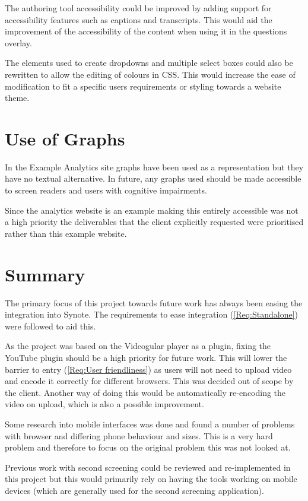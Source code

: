 The authoring tool accessibility could be improved by adding support for accessibility features such as captions and transcripts. This would aid the improvement of the accessibility of the content when using it in the questions overlay.

The elements used to create dropdowns and multiple select boxes could also be rewritten to allow the editing of colours in \gls{CSS}. This would increase the ease of modification to fit a specific users requirements or styling towards a website theme.

\section{Use of Graphs}

In the Example Analytics site graphs have been used as a representation but they have no textual alternative. In future, any graphs used should be made accessible to screen readers and users with cognitive impairments.

Since the analytics website is an example making this entirely accessible was not a high priority the deliverables that the client explicitly requested were prioritised rather than this example website.

\section{Summary}

The primary focus of this project towards future work has always been easing the integration into Synote. The requirements to ease integration (\cref{Req:Standalone}) were followed to aid this.

As the project was based on the Videogular player as a plugin, fixing the YouTube plugin should be a high priority for future work. This will lower the barrier to entry (\cref{Req:User friendliness}) as users will not need to upload video and encode it correctly for different browsers. This was decided out of scope by the client. Another way of doing this would be automatically re-encoding the video on upload, which is also a possible improvement.

Some research into mobile interfaces was done and found a number of problems with browser and differing phone behaviour and sizes. This is a very hard problem and therefore to focus on the original problem this was not looked at.

Previous work with second screening could be reviewed and re-implemented in this project but this would primarily rely on having the tools working on mobile devices (which are generally used for the second screening application).

